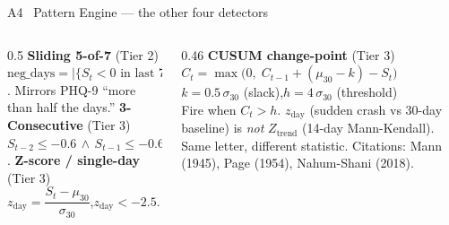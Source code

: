 \documentclass[aspectratio=169,11pt]{beamer}
\begin{document}
\begin{frame}{A4 \textperiodcentered\ Pattern Engine --- the other four detectors}
\begin{columns}[T,onlytextwidth]
  \begin{column}{0.5\textwidth}
    {\footnotesize\textbf{Sliding 5-of-7} (Tier 2)}\\
    {\footnotesize $\text{neg\_days}=\lvert\{S_t<0 \text{ in last 7}\}\rvert \geq 5$. Mirrors PHQ-9 ``more than half the days.''}
    \vspace{0.5em}
    {\footnotesize\textbf{3-Consecutive} (Tier 3)}\\
    {\footnotesize $S_{t-2}\leq-0.6 \,\wedge\, S_{t-1}\leq-0.6 \,\wedge\, S_t\leq-0.6$.}
    \vspace{0.5em}
    {\footnotesize\textbf{Z-score / single-day} (Tier 3)}\\
    {\footnotesize $z_{\text{day}} = \dfrac{S_t - \mu_{30}}{\sigma_{30}}$,\quad $z_{\text{day}} < -2.5$.}
  \end{column}
  \begin{column}{0.46\textwidth}
    {\footnotesize\textbf{CUSUM change-point} (Tier 3)}\\
    {\footnotesize $C_t = \max\!\big(0,\; C_{t-1} + (\mu_{30}-k) - S_t\big)$\\[0.3em]
    $k = 0.5\,\sigma_{30}$ (slack),\quad $h = 4\,\sigma_{30}$ (threshold)\\[0.3em]
    Fire when $C_t > h$.}
    \vspace{0.6em}
    {\scriptsize $z_{\text{day}}$ (sudden crash vs 30-day baseline) is \emph{not} $Z_{\text{trend}}$ (14-day Mann-Kendall). Same letter, different statistic. Citations: Mann (1945), Page (1954), Nahum-Shani (2018).}
  \end{column}
\end{columns}
\end{frame}
\end{document}

